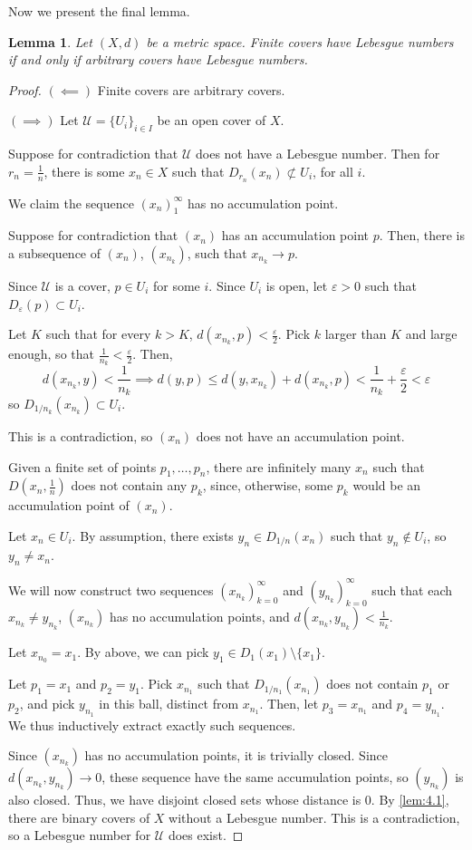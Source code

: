\documentclass[openany, amssymb, psamsfonts]{amsart}
\let\fullref\autoref
\newtheorem{lem}{Lemma}[section]
\theoremstyle{definition}
\numberwithin{equation}{section}
\begin{document}
Now we present the final lemma.
\begin{lem} \label{lem:4.6}
  Let $(X,d)$ be a metric space. Finite covers have Lebesgue numbers if and only if arbitrary covers have Lebesgue numbers.
\end{lem}
\begin{proof}
  $(\impliedby)$ Finite covers are arbitrary covers. 

  $(\implies)$ Let $\mathcal{U} = \{U_i\}_{i\in I}$ be an open cover of $X$. 

  Suppose for contradiction that $\mathcal{U}$ does not have a Lebesgue number. Then for $r_n = \frac1{n}$, there is some $x_n \in X$ such that $D_{r_n}(x_n) \not\subset U_i$, for all $i$. 

  We claim the sequence $(x_n)_1^\infty$ has no accumulation point. 

  Suppose for contradiction that $(x_n)$ has an accumulation point $p$. Then, there is a subsequence of $(x_n)$, $(x_{n_k})$, such that $x_{n_k}\to p$. 

  Since $\mathcal{U}$ is a cover, $p \in U_i$ for some $i$. Since $U_i$ is open, let $\varepsilon>0$ such that $D_\varepsilon(p) \subset U_i$. 

  Let $K$ such that for every $k > K$, $d(x_{n_k}, p) < \frac{\varepsilon}2$. Pick $k$ larger than $K$ and large enough, so that $\frac1{n_k} < \frac{\varepsilon}2$. Then,
  \[
    d(x_{n_k}, y) < \frac1{n_k} \implies d(y,p) \le d(y, x_{n_k}) + d(x_{n_k}, p) < \frac1{n_k} +  \frac{\varepsilon}2 < \varepsilon
  \]
  so $D_{1/n_k}(x_{n_k}) \subset U_i$. 

  This is a contradiction, so $(x_n)$ does not have an accumulation point. 

  Given a finite set of points $p_1, \ldots, p_n$, there are infinitely many $x_n$ such that $D(x_n, \frac1{n})$ does not contain any $p_k$, since, otherwise, some $p_k$ would be an accumulation point of $(x_n)$.   

  Let $x_n \in U_i$. By assumption, there exists $y_n \in D_{1/n}(x_n)$ such that $y_n \not \in U_i$, so $y_n \neq x_n$. 

  We will now construct two sequences $(x_{n_k})_{k=0}^\infty$ and $(y_{n_k})_{k=0}^\infty$ such that each $x_{n_k} \neq y_{n_k}$, $(x_{n_k})$ has no accumulation points, and $d(x_{n_k}, y_{n_k}) < \frac1{n_k}$. 

  Let $x_{n_0} = x_1$. By above, we can pick $y_1 \in D_1(x_1) \setminus \{x_1\}$. 

  Let $p_1 = x_1$ and $p_2 = y_1$. Pick $x_{n_1}$ such that $D_{1/n_1}(x_{n_1})$ does not contain $p_1$ or $p_2$, and pick $y_{n_1}$ in this ball, distinct from $x_{n_1}$. Then, let $p_3 = x_{n_1}$ and $p_4 = y_{n_1}$. We thus inductively extract exactly such sequences. 

  Since $(x_{n_k})$ has no accumulation points, it is trivially closed. Since $d(x_{n_k}, y_{n_k}) \to 0$, these sequence have the same accumulation points, so $(y_{n_k})$ is also closed. Thus, we have disjoint closed sets whose distance is $0$. By \fullref{lem:4.1}, there are binary covers of $X$ without a Lebesgue number. This is a contradiction, so a Lebesgue number for $\mathcal{U}$ does exist. 
\end{proof}
\end{document}
